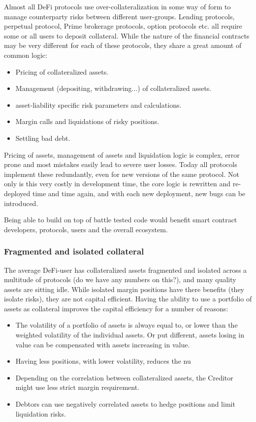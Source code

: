 \documentclass[sigconf,nonacm]{acmart}
\begin{document}
Almost all DeFi protocols use over-collateralization in some way of form to manage counterparty risks between different user-groups.
Lending protocols, perpetual protocol, Prime brokerage protocols, option protocols etc. all require some or all users to deposit collateral.
While the nature of the financial contracts may be very different for each of these protocols, they share a great amount of common logic:
\begin{itemize}
    \item Pricing of collateralized assets.
    \item Management (depositing, withdrawing...) of collateralized assets.
    \item asset-liability specific risk parameters and calculations.
    \item Margin calls and liquidations of risky positions.
    \item Settling bad debt.
\end{itemize}

Pricing of assets, management of assets and liquidation logic is complex, error prone and most mistakes easily lead to severe user losses.
Today all protocols implement these redundantly, even for new versions of the same protocol. 
Not only is this very costly in development time, the core logic is rewritten and re-deployed time and time again, and with each new deployment, new bugs can be introduced.

Being able to build on top of battle tested code would benefit smart contract developers, protocols, users and the overall ecosystem.

\subsubsection{Fragmented and isolated collateral}
\label{subsubsec:fragmented-collateral}

The average DeFi-user has collateralized assets fragmented and isolated across a multitude of protocols (do we have any numbers on this?), and many quality assets are sitting idle.
While isolated margin positions have there benefits (they isolate risks), they are not capital efficient.
Having the ability to use a portfolio of assets as collateral improves the capital efficiency for a number of reasons:
\begin{itemize}
    \item The volatility of a portfolio of assets is always equal to, or lower than the weighted volatility of the individual assets.
    Or put different, assets losing in value can be compensated with assets increasing in value.
    \item Having less positions, with lower volatility, reduces the nu
    \item Depending on the correlation between collateralized assets, the Creditor might use less strict margin requirement.
    \item Debtors can use negatively correlated assets to hedge positions and limit liquidation risks.
\end{itemize}
\end{document}

